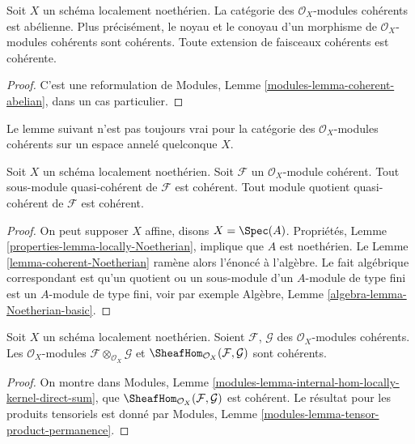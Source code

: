 \begin{lemma}
\label{lemma-coherent-abelian-Noetherian}
Soit $X$ un schéma localement noethérien.
La catégorie des $\mathcal{O}_X$-modules cohérents est abélienne.
Plus précisément, le noyau et le conoyau d'un morphisme de
$\mathcal{O}_X$-modules cohérents sont cohérents. Toute extension
de faisceaux cohérents est cohérente.
\end{lemma}

\begin{proof}
C'est une reformulation de
Modules, Lemme \ref{modules-lemma-coherent-abelian},
dans un cas particulier.
\end{proof}

\noindent
Le lemme suivant n'est pas toujours vrai pour la catégorie des
$\mathcal{O}_X$-modules cohérents sur un espace annelé quelconque $X$.

\begin{lemma}
\label{lemma-coherent-Noetherian-quasi-coherent-sub-quotient}
Soit $X$ un schéma localement noethérien.
Soit $\mathcal{F}$ un $\mathcal{O}_X$-module cohérent.
Tout sous-module quasi-cohérent de $\mathcal{F}$ est cohérent.
Tout module quotient quasi-cohérent de $\mathcal{F}$ est cohérent.
\end{lemma}

\begin{proof}
On peut supposer $X$ affine, disons $X = \Spec(A)$.
Propriétés, Lemme \ref{properties-lemma-locally-Noetherian},
implique que $A$ est noethérien. Le Lemme \ref{lemma-coherent-Noetherian}
ramène alors l'énoncé à l'algèbre. Le fait algébrique correspondant
est qu'un quotient ou un sous-module d'un $A$-module de type fini
est un $A$-module de type fini, voir par exemple
Algèbre, Lemme \ref{algebra-lemma-Noetherian-basic}.
\end{proof}

\begin{lemma}
\label{lemma-tensor-hom-coherent}
Soit $X$ un schéma localement noethérien.
Soient $\mathcal{F}$, $\mathcal{G}$ des $\mathcal{O}_X$-modules cohérents.
Les $\mathcal{O}_X$-modules $\mathcal{F} \otimes_{\mathcal{O}_X} \mathcal{G}$
et $\SheafHom_{\mathcal{O}_X}(\mathcal{F}, \mathcal{G})$ sont
cohérents.
\end{lemma}

\begin{proof}
On montre dans
Modules, Lemme \ref{modules-lemma-internal-hom-locally-kernel-direct-sum}, que
$\SheafHom_{\mathcal{O}_X}(\mathcal{F}, \mathcal{G})$ est cohérent.
Le résultat pour les produits tensoriels est donné par
Modules, Lemme \ref{modules-lemma-tensor-product-permanence}.
\end{proof}

